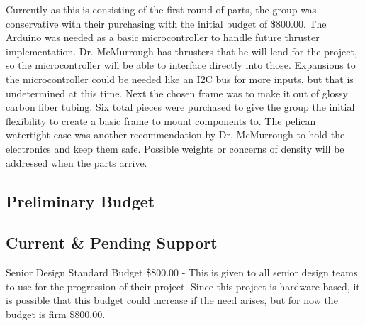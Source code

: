 Currently as this is consisting of the first round of parts, the group was conservative with their purchasing with the initial budget of \$800.00. The Arduino was needed as a basic microcontroller to handle future thruster implementation. Dr. McMurrough has thrusters that he will lend for the project, so the microcontroller will be able to interface directly into those. Expansions to the microcontroller could be needed like an I2C bus for more inputs, but that is undetermined at this time. Next the chosen frame was to make it out of glossy carbon fiber tubing. Six total pieces were purchased to give the group the initial flexibility to create a basic frame to mount components to. The pelican watertight case was another recommendation by Dr. McMurrough to hold the electronics and keep them safe. Possible weights or concerns of density will be addressed when the parts arrive.



\subsection{Preliminary Budget}
\begin{table}[H]
	\caption{Breakdown of Current Costs} 
\end{table}



\subsection{Current \& Pending Support}
Senior Design Standard Budget \$800.00 - This is given to all senior design teams to use for the progression of their project. Since this project is hardware based, it is possible that this budget could increase if the need arises, but for now the budget is firm \$800.00.
